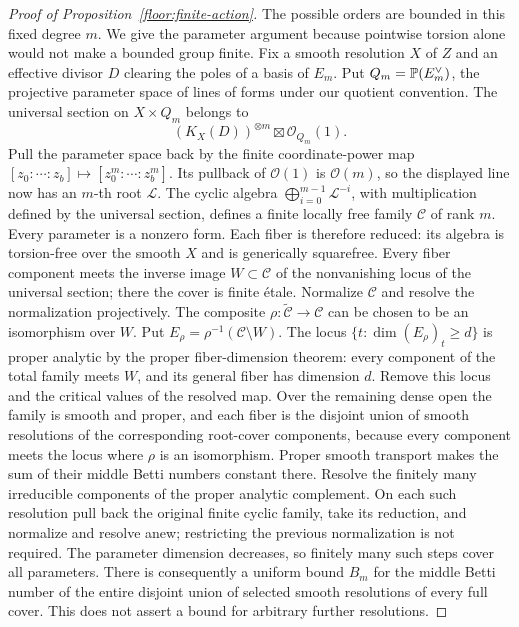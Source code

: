\begin{proof}[Proof of Proposition~\ref{floor:finite-action}]
The possible orders are bounded in this fixed degree \(m\).  We give the
parameter argument because pointwise torsion alone would not make a bounded
group finite.  Fix a smooth resolution \(X\) of \(Z\) and an effective
divisor \(D\) clearing the poles of a basis of \(E_m\).  Put
\(Q_m=\mathbb P(E_m^\vee)\), the projective parameter space of lines of forms
under our quotient convention.  The universal section on \(X\times Q_m\)
belongs to
\[
 (K_X(D))^{\otimes m}\boxtimes\mathcal O_{Q_m}(1).
\]
Pull the parameter space back by the finite coordinate-power map
\([z_0:\cdots:z_b]\mapsto[z_0^m:\cdots:z_b^m]\).  Its pullback of
\(\mathcal O(1)\) is \(\mathcal O(m)\), so the displayed line now has
an \(m\)-th root \(\mathscr L\).  The cyclic algebra
\(\bigoplus_{i=0}^{m-1}\mathscr L^{-i}\), with multiplication defined
by the universal section, defines a finite locally free family
\(\mathcal C\) of rank \(m\).
Every parameter is a nonzero form.  Each fiber is therefore reduced:
its algebra is torsion-free over the smooth \(X\) and is generically
squarefree.  Every fiber component meets the inverse image
\(W\subset\mathcal C\) of the nonvanishing locus of the universal
section; there the cover is finite \'etale.  Normalize \(\mathcal C\)
and resolve the normalization projectively.  The composite
\(\rho:\widetilde{\mathcal C}\to\mathcal C\) can be chosen to be an isomorphism
over \(W\).  Put \(E_\rho=\rho^{-1}(\mathcal C\setminus W)\).
The locus
\(\{t:\dim(E_\rho)_t\ge d\}\) is proper analytic by the proper
fiber-dimension theorem: every component of the total family meets
\(W\), and its general fiber has dimension \(d\).  Remove this locus
and the critical values of the resolved map.  Over the remaining dense
open the family is smooth and proper, and each fiber is the disjoint
union of smooth resolutions of the corresponding root-cover components,
because every component meets the locus where \(\rho\) is an isomorphism.
Proper smooth transport makes the sum of their middle Betti numbers
constant there.  Resolve
the finitely many irreducible components of the proper analytic complement.
On each such resolution pull back the original finite cyclic family, take
its reduction, and normalize and resolve anew; restricting the previous
normalization is not required.  The parameter dimension decreases,
so finitely many such steps cover all parameters.  There is consequently a
uniform bound \(B_m\) for the middle Betti number of the entire disjoint
union of selected smooth resolutions of every full cover.  This does not assert a bound for
arbitrary further resolutions.


\end{proof}
